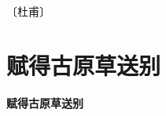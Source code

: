 \documentclass[12pt,UTF-8,openany,fontset=none]{ctexbook}
\begin{document}
\begin{center}
    \vspace{10pt}
    
    \begin{large}
        
        〔杜甫〕
        
    \end{large}
    
    \vspace{8pt}
    
    \begin{huge}
        
        \phantom{。}

        \phantom{。}
        
        \phantom{。}

        \phantom{。}
        
        \phantom{。}

        \phantom{。}
        
        \phantom{。}

        \phantom{。}
        
    \end{huge}
    
\end{center}

\vspace{8pt}
\clearpage


\section{赋得古原草送别}



\begin{center}
    {\bfseries 赋得古原草送别}
\end{center}
\end{document}
